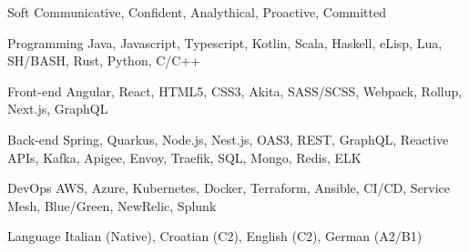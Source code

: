 
\begin{cvskills}

  \cvskill
    {Soft} %
    {Communicative, Confident, Analythical, Proactive, Committed} %

  \cvskill
    {Programming} %
    {Java, Javascript, Typescript, Kotlin, Scala, Haskell, eLisp, Lua, SH/BASH, Rust, Python, C/C++} %

  \cvskill
    {Front-end} %
    {Angular, React, HTML5, CSS3, Akita, SASS/SCSS, Webpack, Rollup, Next.js, GraphQL} %
    
  \cvskill
    {Back-end} %
    {Spring, Quarkus, Node.js, Nest.js, OAS3, REST, GraphQL, Reactive APIs, Kafka, Apigee, Envoy, Traefik, SQL, Mongo, Redis, ELK} %

  \cvskill
    {DevOps} %
    {AWS, Azure, Kubernetes, Docker, Terraform, Ansible, CI/CD, Service Mesh, Blue/Green, NewRelic, Splunk} %

  \cvskill
    {Language} %
    {Italian (Native), Croatian (C2), English (C2), German (A2/B1)} %

\end{cvskills}
